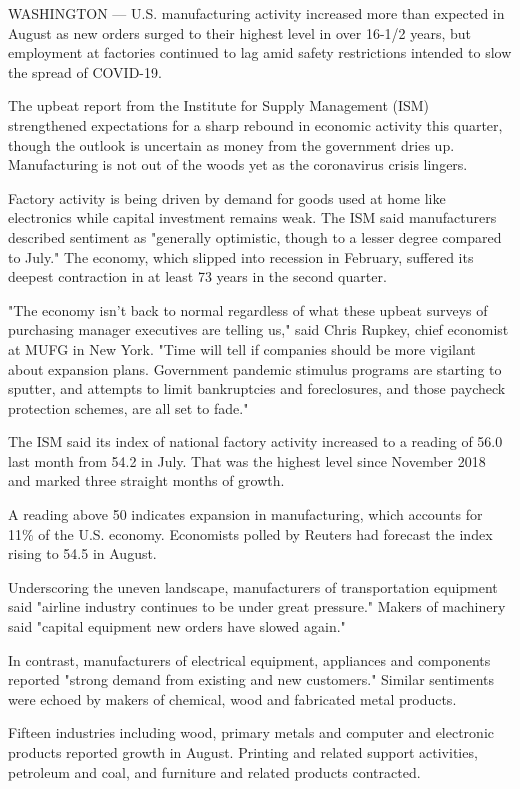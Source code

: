 WASHINGTON --- U.S. manufacturing activity increased more than expected
in August as new orders surged to their highest level in over 16-1/2
years, but employment at factories continued to lag amid safety
restrictions intended to slow the spread of COVID-19.

The upbeat report from the Institute for Supply Management (ISM)
strengthened expectations for a sharp rebound in economic activity this
quarter, though the outlook is uncertain as money from the government
dries up. Manufacturing is not out of the woods yet as the coronavirus
crisis lingers.

Factory activity is being driven by demand for goods used at home like
electronics while capital investment remains weak. The ISM said
manufacturers described sentiment as "generally optimistic, though to a
lesser degree compared to July." The economy, which slipped into
recession in February, suffered its deepest contraction in at least 73
years in the second quarter.

"The economy isn't back to normal regardless of what these upbeat
surveys of purchasing manager executives are telling us," said Chris
Rupkey, chief economist at MUFG in New York. "Time will tell if
companies should be more vigilant about expansion plans. Government
pandemic stimulus programs are starting to sputter, and attempts to
limit bankruptcies and foreclosures, and those paycheck protection
schemes, are all set to fade."

The ISM said its index of national factory activity increased to a
reading of 56.0 last month from 54.2 in July. That was the highest level
since November 2018 and marked three straight months of growth.

A reading above 50 indicates expansion in manufacturing, which accounts
for 11\% of the U.S. economy. Economists polled by Reuters had forecast
the index rising to 54.5 in August.

Underscoring the uneven landscape, manufacturers of transportation
equipment said "airline industry continues to be under great pressure."
Makers of machinery said "capital equipment new orders have slowed
again."

In contrast, manufacturers of electrical equipment, appliances and
components reported "strong demand from existing and new customers."
Similar sentiments were echoed by makers of chemical, wood and
fabricated metal products.

Fifteen industries including wood, primary metals and computer and
electronic products reported growth in August. Printing and related
support activities, petroleum and coal, and furniture and related
products contracted.

